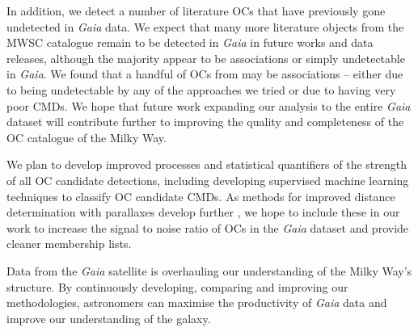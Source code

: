 In addition, we detect a number of literature OCs that have previously gone undetected in \emph{Gaia} data. We expect that many more literature objects from the MWSC catalogue remain to be detected in \emph{Gaia} in future works and data releases, although the majority appear to be associations or simply undetectable in  \emph{Gaia}. We found that a handful of OCs from \cite{cantat-gaudin_clusters_2020} may be associations -- either due to being undetectable by any of the approaches we tried or due to having very poor CMDs. We hope that future work expanding our analysis to the entire \emph{Gaia} dataset will contribute further to improving the quality and completeness of the OC catalogue of the Milky Way.

\emph{} 

We plan to develop improved processes and statistical quantifiers of the strength of all OC candidate detections, including developing supervised machine learning techniques to classify OC candidate CMDs. As methods for improved distance determination with parallaxes develop further , we hope to include these in our work to increase the signal to noise ratio of OCs in the \emph{Gaia} dataset and provide cleaner membership lists. 

Data from the \emph{Gaia} satellite is overhauling our understanding of the Milky Way's structure. By continuously developing, comparing and improving our methodologies, astronomers can maximise the productivity of \emph{Gaia} data and improve our understanding of the galaxy.
